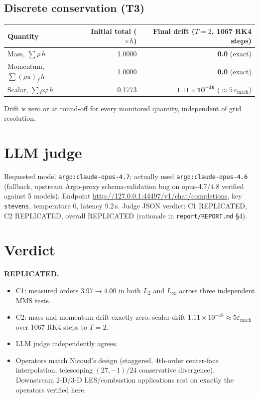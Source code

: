 \documentclass[11pt]{article}
\begin{document}
\subsection{Discrete conservation (T3)}
\begin{center}
\begin{tabular}{lrr}
\toprule
Quantity & Initial total ($\times h$) & Final drift ($T=2$, 1067 RK4 steps)\\
\midrule
Mass, $\sum\rho\,h$          & 1.0000 & \textbf{0.0} (exact)\\
Momentum, $\sum(\rho u)_f\,h$ & 1.0000 & \textbf{0.0} (exact)\\
Scalar,  $\sum\rho\varphi\,h$ & 0.1773 & $\mathbf{1.11\times 10^{-16}}$ ($\approx 5\,\varepsilon_\text{mach}$)\\
\bottomrule
\end{tabular}
\end{center}
Drift is zero or at round-off for every monitored quantity, independent of
grid resolution. \checkmark

\section{LLM judge}
Requested model \texttt{argo:claude-opus-4.7}; actually used
\texttt{argo:claude-opus-4.6} (fallback, upstream Argo-proxy schema-validation
bug on opus-4.7/4.8 verified against 5 models). Endpoint
\url{http://127.0.0.1:44497/v1/chat/completions}, key \texttt{stevens},
temperature 0, latency 9.2\,s. Judge JSON verdict: C1 REPLICATED, C2
REPLICATED, overall REPLICATED (rationale in \texttt{report/REPORT.md} \S4).

\section{Verdict}
\textbf{REPLICATED.}
\begin{itemize}
  \item C1: measured orders \(3.97\to 4.00\) in both \(L_2\) and \(L_\infty\)
        across three independent MMS tests.
  \item C2: mass and momentum drift exactly zero, scalar drift
        \(1.11\times 10^{-16}\approx 5\varepsilon_\text{mach}\) over 1067 RK4
        steps to \(T=2\).
  \item LLM judge independently agrees.
  \item Operators match Nicoud's design (staggered, 4th-order center-face
        interpolation, telescoping \((27,-1)/24\) conservative divergence).
        Downstream 2-D/3-D LES/combustion applications rest on exactly the
        operators verified here.
\end{itemize}
\end{document}
